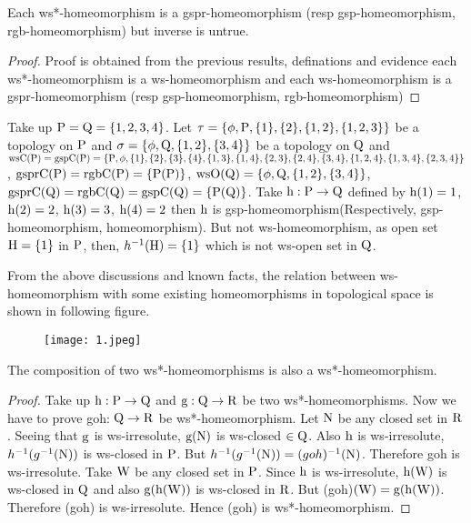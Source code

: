 \begin{thm}\label{thm5.2.7}
Each ws*-homeomorphism is a gspr-homeomorphism (resp gsp-homeomorphism, rgb-homeomorphism) but inverse is untrue.
\end{thm}

\begin{proof}
Proof is obtained from the previous results, definations and evidence each ws*-homeomorphism is a ws-homeomorphism and each ws-homeomorphism is a gspr-homeomorphism (resp gsp-homeomorphism, rgb-homeomorphism)
\end{proof}

\begin{exm}\label{exam5.2.10}
Take up $\mathrm{P}=\mathrm{Q}= \{1, 2, 3, 4\}$. Let $\tau= \{\phi, \TSP, \{1\}, \{2\}, \{1, 2\},\break \{1,2,3\}\}$ be a topology on $\mathrm{P}$ and $\sigma=\{\phi,\mathrm{Q},\{1,2\},\{3,4\}\}$ be a topology on $\mathrm{Q}$ and $\ws\TSC(\TSP)= \gsp\TSC(\TSP)=\{\TSP, \phi,\{1\},\{2\},\{3\},\{4\},\{1,3\},\{1,4\},\{2,3\},\{2,4\},\{3,4\},\break \{1,2,4\},\{1,3,4\},\{2,3,4\}\}$, $\mathrm{gspr}\mathrm{C}(\mathrm{P})=\mathrm{rgb}\mathrm{C}(\mathrm{P})=\{\mathrm{P}(\mathrm{P})\}$, $\ws\TSO(\TSQ)=\{\phi,\TSQ,\{1,2\},\break \{3,4\}\}$, $\mathrm{gspr}\mathrm{C}(\mathrm{Q})=\mathrm{rgb}\mathrm{C}(\mathrm{Q})=\mathrm{gsp}\mathrm{C}(\mathrm{Q})=\{\mathrm{P}(\mathrm{Q})\}$. Take $\mathrm{h}: \mathrm{P}\to \mathrm{Q}$ defined by $\mathrm{h}(1)=1$, $\mathrm{h}(2)= 2$, $\mathrm{h}(3)=3$, $\mathrm{h}(4)=2$ then $\mathrm{h}$ is gsp-homeomorphism(Respectively, gsp-homeomorphism, homeomorphism). But not ws-homeomorphism, as open set $\mathrm{H}= \{1\}$ in $\mathrm{P}$, then, $h^{-1} (\mathrm{H}) = \{1\}$ which is not ws-open set in $\mathrm{Q}$.
\end{exm}

\begin{rem}\label{rem5.2.3} 
From the above discussions and known facts, the relation between ws-homeomorphism with some existing homeomorphisms in topological space is shown in
following figure.
\begin{figure}[!ht]
\centering
\texttt{[image: 1.jpeg]}
\end{figure}
\end{rem}

\begin{thm}\label{thm5.2.8} 
The composition of two ws*-homeomorphisms is also a ws*-{\break}homeomor\-phism.
\end{thm}

\begin{proof}
Take up $\mathrm{h}: \mathrm{P}\to \mathrm{Q}$ and $\mathrm{g}: \mathrm{Q}\to \mathrm{R}$ be two ws*-homeomorphisms. Now we have to prove goh: $\mathrm{Q}\to \mathrm{R}$ be ws*-homeomorphism. Let $\mathrm{N}$ be any closed set in $\mathrm{R}$. Seeing that $\mathrm{g}$ is ws-irresolute, $\mathrm{g}(\mathrm{N})$ is ws-closed $\in \mathrm{Q}$. Also $\mathrm{h}$ is ws-irresolute, $h^{-1} (g^{-1} (\mathrm{N}))$ is ws-closed in $\mathrm{P}$. But $h^{-1} (g^{-1}(\mathrm{N}))= (goh)^{-1}(\mathrm{N})$. Therefore goh is ws-irresolute. Take $\mathrm{W}$ be any closed set in $\mathrm{P}$. Since $\mathrm{h}$ is ws-irresolute, $\mathrm{h}(\mathrm{W})$ is ws-closed in $\mathrm{Q}$ and also $\mathrm{g}(\mathrm{h}(\mathrm{W}))$ is ws-closed in $\mathrm{R}$. But (goh)$(\mathrm{W})=\mathrm{g}(\mathrm{h}(\mathrm{W}))$. Therefore (goh) is ws-irresolute. Hence (goh) is ws*-homeomorphism.
\end{proof}

